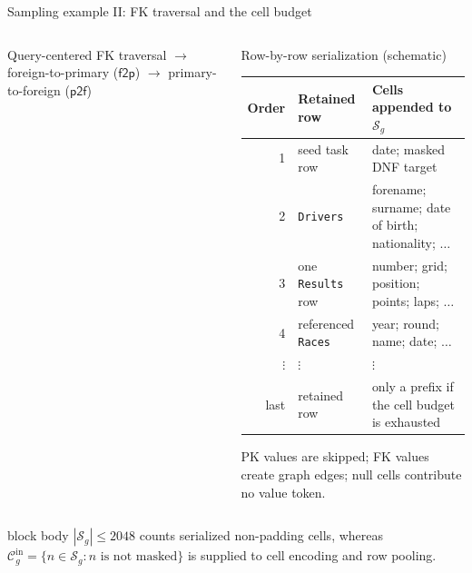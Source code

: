 \documentclass[aspectratio=169,10pt,t]{beamer}
\begin{document}
\begin{frame}{Sampling example II: FK traversal and the cell budget}
\begin{columns}[T,onlytextwidth]
\begin{block}{Query-centered FK traversal}
        \vspace{-.08cm}
        {\fontsize{6.2}{7}\selectfont
          \color{Blue}$\longrightarrow$ foreign-to-primary ($\mathsf{f2p}$)
          \hspace{.55em}
          \color{Teal}$\longrightarrow$ primary-to-foreign ($\mathsf{p2f}$)}
      \end{block}

      \begin{block}{Row-by-row serialization (schematic)}
        \centering
        {\fontsize{6.2}{7.2}\selectfont
        \setlength{\tabcolsep}{3.0pt}
        \renewcommand{\arraystretch}{1.24}
        \begin{tabularx}{\linewidth}{r l X}
          \toprule
          Order & Retained row & Cells appended to $\mathcal S_g$ \\
          \midrule
          1 & seed task row
            & date; masked DNF target \\
          \rowcolor{PaleBlue}
          2 & \texttt{Drivers}
            & forename; surname; date of birth; nationality; $\ldots$ \\
          3 & one \texttt{Results} row
            & number; grid; position; points; laps; $\ldots$ \\
          \rowcolor{PaleBlue}
          4 & referenced \texttt{Races}
            & year; round; name; date; $\ldots$ \\
          $\vdots$ & $\vdots$ & $\vdots$ \\
          last & retained row
            & only a prefix if the cell budget is exhausted \\
          \bottomrule
        \end{tabularx}}

        \vspace{.12cm}
        \raggedright\scriptsize
        PK values are skipped; FK values create graph edges; null cells contribute no value token.
      \end{block}
  \end{columns}

  \vspace{.12cm}
  \begin{beamercolorbox}[sep=.52em,wd=\linewidth]{block body}
    \centering\small
    $|\mathcal S_g|\le 2048$ counts serialized non-padding cells, whereas
    $\mathcal C_g^{\mathrm{in}}=\{n\in\mathcal S_g:n\text{ is not masked}\}$ is supplied to cell encoding and row pooling.
  \end{beamercolorbox}
\end{frame}
\end{document}
